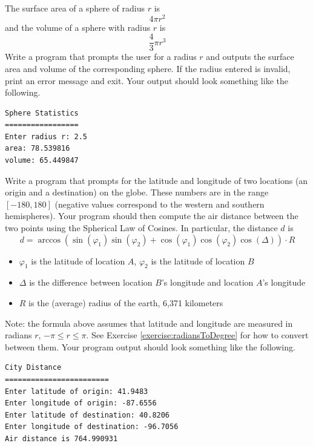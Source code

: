 \begin{exer}
The surface area of a sphere of radius $r$ is
  $$4\pi r^2$$
and the volume of a sphere with radius $r$ is 
  $$\frac{4}{3}\pi r^3$$
Write a program that prompts the user for a radius $r$ and outputs the surface area and volume of 
the corresponding sphere.  If the radius entered is invalid, print an error message and exit.  Your
output should look something like the following.

\begin{verbatim}
Sphere Statistics
=================
Enter radius r: 2.5
area: 78.539816
volume: 65.449847
\end{verbatim}
\end{exer}

\begin{exer}
\label{exercise:basics:airDistance}
Write a program that prompts for the latitude and longitude of two locations (an origin and a 
destination) on the globe.  These numbers are in the range $[-180, 180]$ (negative values 
correspond to the western and southern hemispheres).  Your program should then compute 
the air distance between the two points using the Spherical Law of Cosines.  In particular, 
the distance $d$ is
 $$d = \arccos{(\sin(\varphi_1) \sin(\varphi_2) + \cos(\varphi_1) \cos(\varphi_2) \cos(\Delta) )} \cdot R$$
\begin{itemize}
  \item $\varphi_1$ is the latitude of location $A$, $\varphi_2$ is the latitude of location $B$
  \item $\Delta$ is the difference between location $B$'s longitude and location $A$'s longitude
  \item $R$ is the (average) radius of the earth, 6,371 kilometers
\end{itemize}
Note: the formula above assumes that latitude and longitude are measured in radians $r$, $-\pi \leq r \leq \pi$.  
See Exercise \ref{exercise:radiansToDegree} for how to convert between them.  Your program output should 
look something like the following.  

\begin{verbatim}
City Distance
========================
Enter latitude of origin: 41.9483
Enter longitude of origin: -87.6556
Enter latitude of destination: 40.8206
Enter longitude of destination: -96.7056
Air distance is 764.990931
\end{verbatim}

\end{exer}


